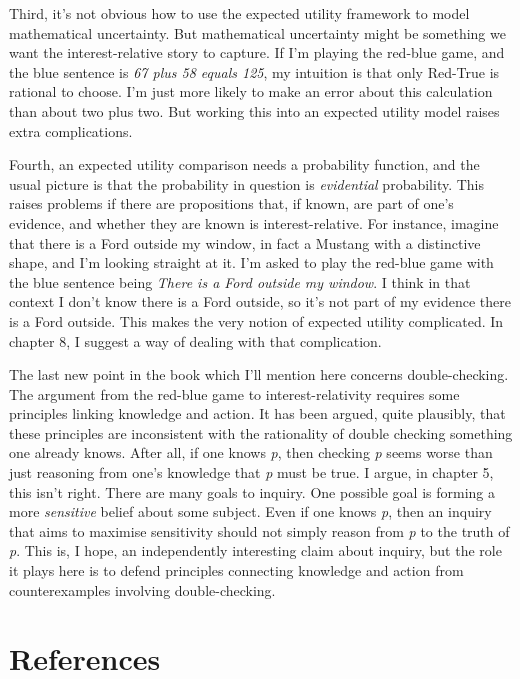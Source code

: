 \documentclass[
  11pt,
  letterpaper,
  DIV=11,
  numbers=noendperiod,
  twoside]{scrartcl}
\begin{document}
Third, it's not obvious how to use the expected utility framework to
model mathematical uncertainty. But mathematical uncertainty might be
something we want the interest-relative story to capture. If I'm playing
the red-blue game, and the blue sentence is \emph{67 plus 58 equals
125}, my intuition is that only Red-True is rational to choose. I'm just
more likely to make an error about this calculation than about two plus
two. But working this into an expected utility model raises extra
complications.

Fourth, an expected utility comparison needs a probability function, and
the usual picture is that the probability in question is
\emph{evidential} probability. This raises problems if there are
propositions that, if known, are part of one's evidence, and whether
they are known is interest-relative. For instance, imagine that there is
a Ford outside my window, in fact a Mustang with a distinctive shape,
and I'm looking straight at it. I'm asked to play the red-blue game with
the blue sentence being \emph{There is a Ford outside my window}. I
think in that context I don't know there is a Ford outside, so it's not
part of my evidence there is a Ford outside. This makes the very notion
of expected utility complicated. In chapter 8, I suggest a way of
dealing with that complication.

The last new point in the book which I'll mention here concerns
double-checking. The argument from the red-blue game to
interest-relativity requires some principles linking knowledge and
action. It has been argued, quite plausibly, that these principles are
inconsistent with the rationality of double checking something one
already knows. After all, if one knows \emph{p}, then checking \emph{p}
seems worse than just reasoning from one's knowledge that \emph{p} must
be true. I argue, in chapter 5, this isn't right. There are many goals
to inquiry. One possible goal is forming a more \emph{sensitive} belief
about some subject. Even if one knows \emph{p}, then an inquiry that
aims to maximise sensitivity should not simply reason from \emph{p} to
the truth of \emph{p}. This is, I hope, an independently interesting
claim about inquiry, but the role it plays here is to defend principles
connecting knowledge and action from counterexamples involving
double-checking.

\section*{References}\label{references}
\end{document}
